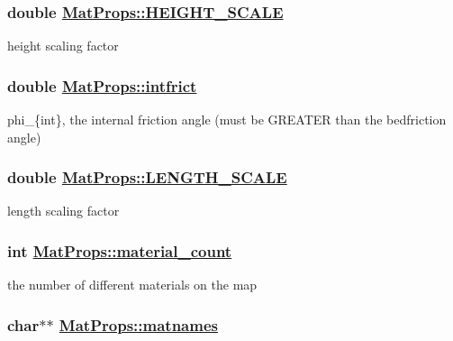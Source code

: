 \hypertarget{structMatProps_o14}{
\subsubsection[HEIGHT\_\-SCALE]{\setlength{\rightskip}{0pt plus 5cm}double \hyperlink{structMatProps_o14}{Mat\-Props::HEIGHT\_\-SCALE}}}
\label{structMatProps_o14}


height scaling factor 

\hypertarget{structMatProps_o4}{
\subsubsection[intfrict]{\setlength{\rightskip}{0pt plus 5cm}double \hyperlink{structMatProps_o4}{Mat\-Props::intfrict}}}
\label{structMatProps_o4}


phi\_\-\{int\}, the internal friction angle (must be GREATER than the bedfriction angle) 

\hypertarget{structMatProps_o13}{
\subsubsection[LENGTH\_\-SCALE]{\setlength{\rightskip}{0pt plus 5cm}double \hyperlink{structMatProps_o13}{Mat\-Props::LENGTH\_\-SCALE}}}
\label{structMatProps_o13}


length scaling factor 

\hypertarget{structMatProps_o2}{
\subsubsection[material\_\-count]{\setlength{\rightskip}{0pt plus 5cm}int \hyperlink{structMatProps_o2}{Mat\-Props::material\_\-count}}}
\label{structMatProps_o2}


the number of different materials on the map 

\hypertarget{structMatProps_o3}{
\subsubsection[matnames]{\setlength{\rightskip}{0pt plus 5cm}char$\ast$$\ast$ \hyperlink{structMatProps_o3}{Mat\-Props::matnames}}}
\label{structMatProps_o3}


